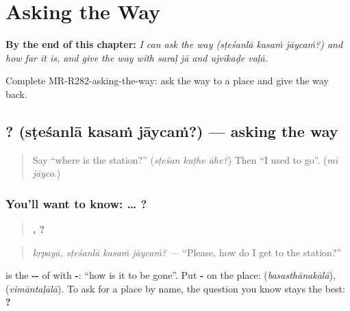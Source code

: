 
\chapter{Asking the Way}
\label{ch:mr-asking-the-way}

\begin{chapteropening}
\textbf{By the end of this chapter:} \emph{I can ask the way (sṭeśanlā kasaṁ jāycaṁ?) and how far it is, and give the way with saraḷ jā and ujvīkaḍe vaḷā.}

Complete MR-R282-asking-the-way: ask the way to a place and give the way back.
\end{chapteropening}

\section[\texorpdfstring{\mr{स्टेशनला} \mr{कसं} \mr{जायचं}? (sṭeśanlā kasaṁ jāycaṁ?)}{स्टेशनला कसं जायचं? (sṭeśanlā kasaṁ jāycaṁ?)}]{  ? (sṭeśanlā kasaṁ jāycaṁ?) — asking the way}

\label{lesson:MR-C282-kasa-jaycha}



\begin{quote}
Say \textquotedblleft{}where is the station?\textquotedblright{} (\emph{sṭeśan kuṭhe āhe?}) Then \textquotedblleft{}I used to go\textquotedblright{}. (\emph{mī jāyco}.)
\end{quote}

\subsection*{You'll want to know: …   ?}
\begin{quote}
\textbf{,   ?}
\end{quote}

\begin{quote}
\emph{kṛpayā, sṭeśanlā kasaṁ jāycaṁ?} — \textquotedblleft{}Please, how do I get to the station?\textquotedblright{}
\end{quote}

\textbf{} is the \textbf{--} of \textbf{} with \textbf{-}: \textquotedblleft{}how is it to be gone\textquotedblright{}. Put \textbf{-} on the place: \textbf{} (\emph{basasthānakālā}), \textbf{} (\emph{vimāntaḷālā}). To ask for a place by name, the question you know stays the best: \textbf{  ?}

